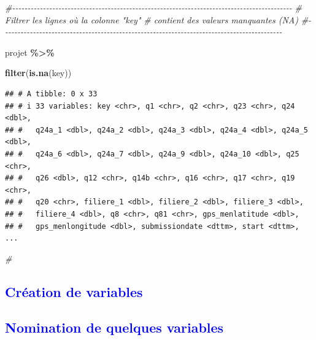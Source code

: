 \documentclass[
]{article}
\newenvironment{Shaded}{\begin{snugshade}}{\end{snugshade}}
\newcommand{\CommentTok}[1]{\textcolor[rgb]{0.56,0.35,0.01}{\textit{#1}}}
\newcommand{\FunctionTok}[1]{\textcolor[rgb]{0.13,0.29,0.53}{\textbf{#1}}}
\newcommand{\NormalTok}[1]{#1}
\newcommand{\SpecialCharTok}[1]{\textcolor[rgb]{0.81,0.36,0.00}{\textbf{#1}}}
\begin{document}
\begin{Shaded}
\begin{Highlighting}[]
\CommentTok{\#{-}{-}{-}{-}{-}{-}{-}{-}{-}{-}{-}{-}{-}{-}{-}{-}{-}{-}{-}{-}{-}{-}{-}{-}{-}{-}{-}{-}{-}{-}{-}{-}{-}{-}{-}{-}{-}{-}{-}{-}{-}{-}{-}{-}{-}{-}{-}{-}{-}{-}{-}{-}{-}{-}{-}{-}{-}{-}{-}{-}{-}{-}{-}{-}{-}{-}{-}{-}{-}{-}{-}{-}{-}{-}{-}{-}{-}{-}{-}{-}{-}{-}{-}{-}{-}{-}{-}{-}{-}{-}{-}}
\CommentTok{\#       Filtrer les lignes où la colonne "key"                }
\CommentTok{\#     contient des valeurs manquantes (NA)                    }
\CommentTok{\#{-}{-}{-}{-}{-}{-}{-}{-}{-}{-}{-}{-}{-}{-}{-}{-}{-}{-}{-}{-}{-}{-}{-}{-}{-}{-}{-}{-}{-}{-}{-}{-}{-}{-}{-}{-}{-}{-}{-}{-}{-}{-}{-}{-}{-}{-}{-}{-}{-}{-}{-}{-}{-}{-}{-}{-}{-}{-}{-}{-}{-}{-}{-}{-}{-}{-}{-}{-}{-}{-}{-}{-}{-}{-}{-}{-}{-}{-}{-}{-}{-}{-}{-}{-}{-}{-}{-}{-}{-}{-}{-}}

\NormalTok{projet }\SpecialCharTok{\%\textgreater{}\%}
  
\FunctionTok{filter}\NormalTok{(}\FunctionTok{is.na}\NormalTok{(key))}
\end{Highlighting}
\end{Shaded}

\begin{verbatim}
## # A tibble: 0 x 33
## # i 33 variables: key <chr>, q1 <chr>, q2 <chr>, q23 <chr>, q24 <dbl>,
## #   q24a_1 <dbl>, q24a_2 <dbl>, q24a_3 <dbl>, q24a_4 <dbl>, q24a_5 <dbl>,
## #   q24a_6 <dbl>, q24a_7 <dbl>, q24a_9 <dbl>, q24a_10 <dbl>, q25 <chr>,
## #   q26 <dbl>, q12 <chr>, q14b <chr>, q16 <chr>, q17 <chr>, q19 <chr>,
## #   q20 <chr>, filiere_1 <dbl>, filiere_2 <dbl>, filiere_3 <dbl>,
## #   filiere_4 <dbl>, q8 <chr>, q81 <chr>, gps_menlatitude <dbl>,
## #   gps_menlongitude <dbl>, submissiondate <dttm>, start <dttm>, ...
\end{verbatim}

\begin{Shaded}
\begin{Highlighting}[]
\CommentTok{\#}
\end{Highlighting}
\end{Shaded}

\textcolor{blue}{\subsection{Création de variables}}

\textcolor{blue}{\subsection{Nomination de quelques variables}}
\end{document}
